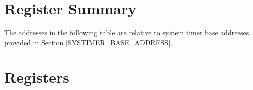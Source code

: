 \documentclass[main\_\_EN.tex]{subfiles}
\begin{document}
\hypertarget{systimer-reg-summ}{}
\section{Register Summary}\label{register summary-30}


The addresses in the following table are relative to system timer base addresses provided in Section \ref{SYSTIMER_BASE_ADDRESS}.



\section{Registers}\label{registers-30}

\end{document}
